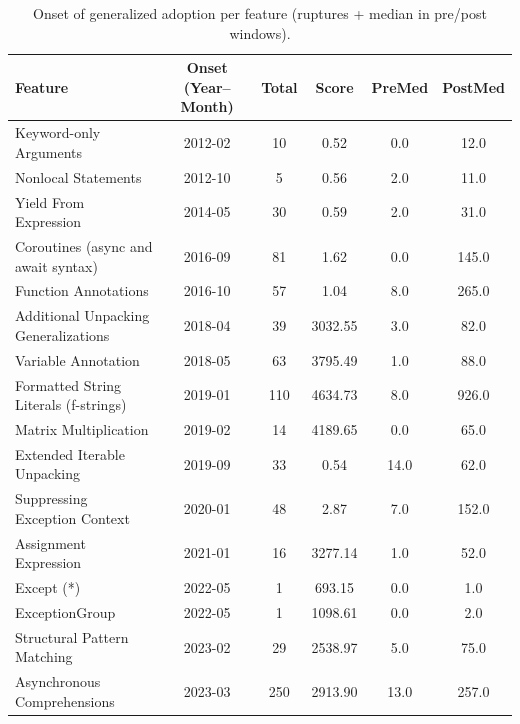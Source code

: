 \begin{table}[htb]
\centering
\caption{Onset of generalized adoption per feature (ruptures + median in pre/post windows).}
\label{tab:trend_onsets_simple}
\begin{tabular}{lccccc}
\toprule
Feature & Onset (Year--Month) & Total & Score & PreMed & PostMed \\
\midrule
Keyword-only Arguments & 2012-02 & 10 & 0.52 & 0.0 & 12.0 \\
Nonlocal Statements & 2012-10 & 5 & 0.56 & 2.0 & 11.0 \\
Yield From Expression & 2014-05 & 30 & 0.59 & 2.0 & 31.0 \\
Coroutines (async and await syntax) & 2016-09 & 81 & 1.62 & 0.0 & 145.0 \\
Function Annotations & 2016-10 & 57 & 1.04 & 8.0 & 265.0 \\
Additional Unpacking Generalizations & 2018-04 & 39 & 3032.55 & 3.0 & 82.0 \\
Variable Annotation & 2018-05 & 63 & 3795.49 & 1.0 & 88.0 \\
Formatted String Literals (f-strings) & 2019-01 & 110 & 4634.73 & 8.0 & 926.0 \\
Matrix Multiplication & 2019-02 & 14 & 4189.65 & 0.0 & 65.0 \\
Extended Iterable Unpacking & 2019-09 & 33 & 0.54 & 14.0 & 62.0 \\
Suppressing Exception Context & 2020-01 & 48 & 2.87 & 7.0 & 152.0 \\
Assignment Expression & 2021-01 & 16 & 3277.14 & 1.0 & 52.0 \\
Except (*) & 2022-05 & 1 & 693.15 & 0.0 & 1.0 \\
ExceptionGroup & 2022-05 & 1 & 1098.61 & 0.0 & 2.0 \\
Structural Pattern Matching & 2023-02 & 29 & 2538.97 & 5.0 & 75.0 \\
Asynchronous Comprehensions & 2023-03 & 250 & 2913.90 & 13.0 & 257.0 \\
\bottomrule
\end{tabular}
\end{table}

